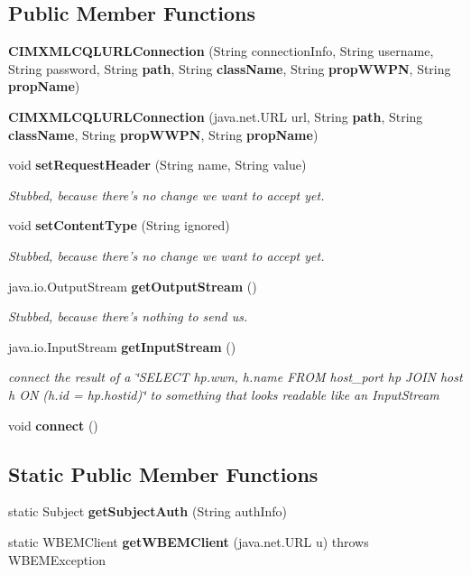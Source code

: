 \subsection*{Public Member Functions}
\begin{DoxyCompactItemize}
\item 
{\bf C\+I\+M\+X\+M\+L\+C\+Q\+L\+U\+R\+L\+Connection} (String connection\+Info, String username, String password, String {\bf path}, String {\bf class\+Name}, String {\bf prop\+W\+W\+P\+N}, String {\bf prop\+Name})
\item 
{\bf C\+I\+M\+X\+M\+L\+C\+Q\+L\+U\+R\+L\+Connection} (java.\+net.\+U\+R\+L url, String {\bf path}, String {\bf class\+Name}, String {\bf prop\+W\+W\+P\+N}, String {\bf prop\+Name})
\item 
void {\bf set\+Request\+Header} (String name, String value)
\begin{DoxyCompactList}\small\item\em Stubbed, because there's no change we want to accept yet. \end{DoxyCompactList}\item 
void {\bf set\+Content\+Type} (String ignored)
\begin{DoxyCompactList}\small\item\em Stubbed, because there's no change we want to accept yet. \end{DoxyCompactList}\item 
java.\+io.\+Output\+Stream {\bf get\+Output\+Stream} ()
\begin{DoxyCompactList}\small\item\em Stubbed, because there's nothing to send us. \end{DoxyCompactList}\item 
java.\+io.\+Input\+Stream {\bf get\+Input\+Stream} ()
\begin{DoxyCompactList}\small\item\em connect the result of a \char`\"{}\+S\+E\+L\+E\+C\+T hp.\+wwn, h.\+name F\+R\+O\+M host\+\_\+port hp J\+O\+I\+N host h O\+N (h.\+id = hp.\+hostid)\char`\"{} to something that looks readable like an Input\+Stream \end{DoxyCompactList}\item 
void {\bf connect} ()
\end{DoxyCompactItemize}
\subsection*{Static Public Member Functions}
\begin{DoxyCompactItemize}
\item 
static Subject {\bf get\+Subject\+Auth} (String auth\+Info)
\item 
static W\+B\+E\+M\+Client {\bf get\+W\+B\+E\+M\+Client} (java.\+net.\+U\+R\+L u)  throws W\+B\+E\+M\+Exception     
\end{DoxyCompactItemize}
